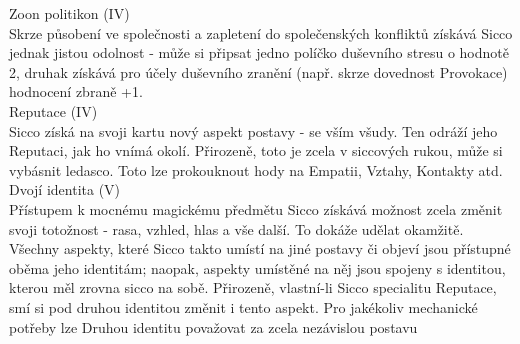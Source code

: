 Zoon politikon (IV)\\
Skrze působení ve společnosti a zapletení do společenských konfliktů získává Sicco jednak jistou odolnost - může si připsat jedno políčko duševního stresu o hodnotě 2, druhak získává pro účely duševního zranění (např. skrze dovednost Provokace) hodnocení zbraně +1.\\

Reputace (IV) \\
Sicco získá na svoji kartu nový aspekt postavy - se vším všudy. Ten odráží jeho Reputaci, jak ho vnímá okolí. Přirozeně, toto je zcela v siccových rukou, může si vybásnit ledasco. Toto lze prokouknout hody na Empatii, Vztahy, Kontakty atd.\\

Dvojí identita (V)\\
Přístupem k mocnému magickému předmětu Sicco získává možnost zcela změnit svoji totožnost - rasa, vzhled, hlas a vše další. To dokáže udělat okamžitě. Všechny aspekty, které Sicco takto umístí na jiné postavy či objeví jsou přístupné oběma jeho identitám; naopak, aspekty umístěné na něj jsou spojeny s identitou, kterou měl zrovna sicco na sobě. Přirozeně, vlastní-li Sicco specialitu Reputace, smí si pod druhou identitou změnit i tento aspekt. Pro jakékoliv mechanické potřeby lze Druhou identitu považovat za zcela nezávislou postavu



